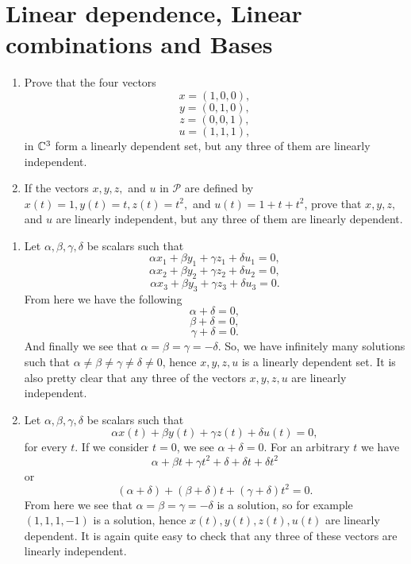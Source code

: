 \section{Linear dependence, Linear combinations and Bases}


\begin{problem}
  \begin{enumerate}[label=(\alph*)]
    \item Prove that the four vectors
      \[x = (1, 0, 0),\]
      \[y = (0, 1, 0),\]
      \[z = (0, 0, 1),\]
      \[u = (1, 1, 1),\]
      in $\mathbb{C}^3$ form a linearly dependent set, but any three of them are linearly independent.
    \item If the vectors $x, y, z,$ and $u$ in $\mathcal{P}$ are defined by $x(t) = 1, y(t) = t, z(t) = t^2,$ and $u(t) = 1 + t + t^2$, prove that $x, y, z,$ and $u$ are linearly independent, but any three of them are linearly dependent.
  \end{enumerate}
\end{problem}

\begin{solution}
  \begin{enumerate}[label=(\alph*)]
    \item Let $\alpha, \beta, \gamma, \delta$ be scalars such that
      \[\alpha x_1 + \beta y_1 + \gamma z_1 + \delta u_1 = 0,\]
      \[\alpha x_2 + \beta y_2 + \gamma z_2 + \delta u_2 = 0,\]
      \[\alpha x_3 + \beta y_3 + \gamma z_3 + \delta u_3 = 0.\]
      From here we have the following
      \[\alpha + \delta = 0,\]
      \[\beta + \delta = 0,\]
      \[\gamma + \delta = 0.\]
      And finally we see that $\alpha = \beta = \gamma = -\delta$.
      So, we have infinitely many solutions such that $\alpha \neq \beta \neq \gamma \neq \delta \neq 0$, hence $x, y, z, u$ is a linearly dependent set.
      It is also pretty clear that any three of the vectors $x, y, z, u$ are linearly independent.
    \item Let $\alpha, \beta, \gamma, \delta$ be scalars such that
      \[\alpha x(t) + \beta y(t) + \gamma z(t) + \delta u(t) = 0,\]
      for every $t$.
      If we consider $t = 0$, we see $\alpha + \delta = 0$.
      For an arbitrary $t$ we have
      \[\alpha + \beta t + \gamma t^2 + \delta + \delta t + \delta t^2\]
      or
      \[(\alpha + \delta) + (\beta + \delta)t + (\gamma + \delta)t^2 = 0.\]
      From here we see that $\alpha = \beta = \gamma = -\delta$ is a solution, so for example $(1, 1, 1, -1)$ is a solution, hence $x(t), y(t), z(t), u(t)$ are linearly dependent.
      It is again quite easy to check that any three of these vectors are linearly independent.
  \end{enumerate}
\end{solution}

